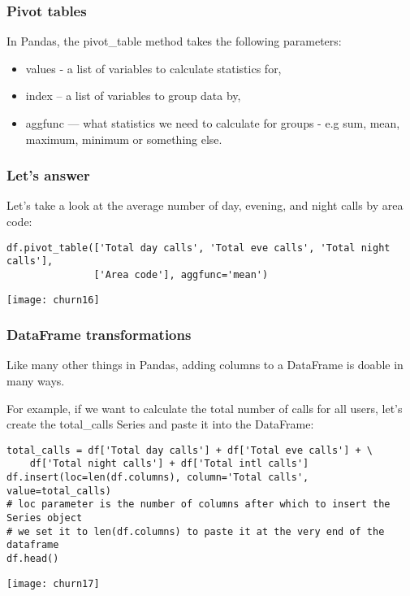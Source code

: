 \begin{frame}[fragile]\frametitle{Pivot tables}	
In Pandas, the pivot\_table method takes the following parameters:

\begin{itemize}
\item values - a list of variables to calculate statistics for,
\item index – a list of variables to group data by,
\item aggfunc — what statistics we need to calculate for groups - e.g sum, mean, maximum, minimum or something else.
\end{itemize}
\end{frame}

\begin{frame}[fragile]\frametitle{Let's answer}	
Let’s take a look at the average number of day, evening, and night calls by area code:
\begin{lstlisting}
df.pivot_table(['Total day calls', 'Total eve calls', 'Total night calls'],
               ['Area code'], aggfunc='mean')
\end{lstlisting}
\begin{center}
\texttt{[image: churn16]}
\end{center}
\end{frame}

\begin{frame}[fragile]\frametitle{DataFrame transformations}	
Like many other things in Pandas, adding columns to a DataFrame is doable in many ways.

For example, if we want to calculate the total number of calls for all users, let's create the total\_calls Series and paste it into the DataFrame:
\begin{lstlisting}
total_calls = df['Total day calls'] + df['Total eve calls'] + \
    df['Total night calls'] + df['Total intl calls']
df.insert(loc=len(df.columns), column='Total calls', value=total_calls) 
# loc parameter is the number of columns after which to insert the Series object
# we set it to len(df.columns) to paste it at the very end of the dataframe
df.head()
\end{lstlisting}
\begin{center}
\texttt{[image: churn17]}
\end{center}
\end{frame}

